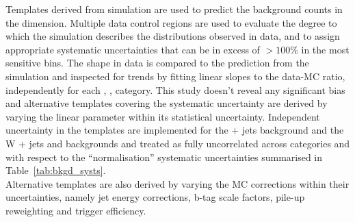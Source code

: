 Templates derived from simulation are used to predict the background
counts in the \mht dimension. Multiple data control regions are used
to evaluate the degree to which the simulation describes the \mht
distributions observed in data, and to assign appropriate systematic
uncertainties that can be in excess of $>100\%$ in the most sensitive
\mht bins. 
The \mht shape in data is compared to the prediction from the simulation 
and inspected for trends by fitting linear slopes to the data-MC ratio, 
independently for each \nj, \nb, \scalht category. 
This study doesn't reveal any significant bias and alternative templates 
covering the systematic uncertainty are derived by varying the 
linear parameter within its statistical uncertainty. 
Independent uncertainty in the templates are implemented for
the \znunu + jets background and the W + jets and \ttbar backgrounds
and treated as fully uncorrelated across categories 
and with respect to the ``normalisation'' systematic
uncertainties summarised in Table~\ref{tab:bkgd_systs}. \\
Alternative \mht templates are also derived by varying the MC corrections within their uncertainties, 
namely jet energy corrections, b-tag scale factors, pile-up reweighting and trigger efficiency.

